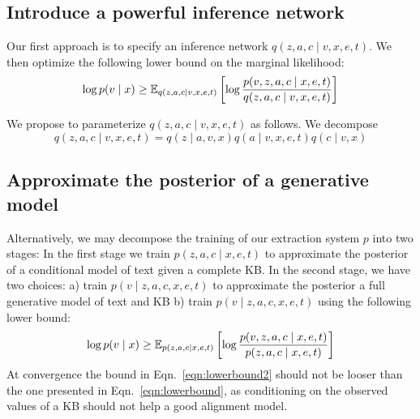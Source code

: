 \documentclass[12pt]{article}
\begin{document}
\subsection{Introduce a powerful inference network}
Our first approach is to specify an inference network $q(z,a,c\mid v,x,e,t)$.
We then optimize the following lower bound on the marginal likelihood:
\begin{equation}
\label{eqn:lowerbound}
\log p(v\mid x) \geq
\mathbb{E}_{q(z,a,c\mid v,x,e,t)}\left[\log \frac{p(v,z,a,c\mid x,e,t)}{q(z,a,c\mid v,x,e,t)}\right]
\end{equation}

We propose to parameterize $q(z,a,c\mid v,x,e,t)$ as follows.
We decompose 
\begin{equation}
q(z,a,c\mid v,x,e,t) = q(z \mid a,v,x)q(a\mid v,x,e,t)q(c \mid v,x)
\end{equation}

\subsection{Approximate the posterior of a generative model}
Alternatively, we may decompose the training of our extraction system $p$ into two stages:
In the first stage we train $p(z,a,c\mid x,e,t)$ to approximate the posterior
of a conditional model of text given a complete KB.
In the second stage, we have two choices:
a) train $p(v \mid z,a,c,x,e,t)$ to approximate the posterior a full generative model of text and KB
b) train $p(v \mid z,a,c,x,e,t)$ using the following lower bound:
\begin{equation}
\label{eqn:lowerbound2}
\log p(v\mid x) \geq
\mathbb{E}_{p(z,a,c\mid x,e,t)}\left[\log \frac{p(v,z,a,c\mid x,e,t)}{p(z,a,c\mid x,e,t)}\right]
\end{equation}
At convergence the bound in Eqn.~\ref{eqn:lowerbound2}
should not be looser than the one presented in Eqn.~\ref{eqn:lowerbound},
as conditioning on the observed values of a KB should not help a good alignment
model.
\end{document}
